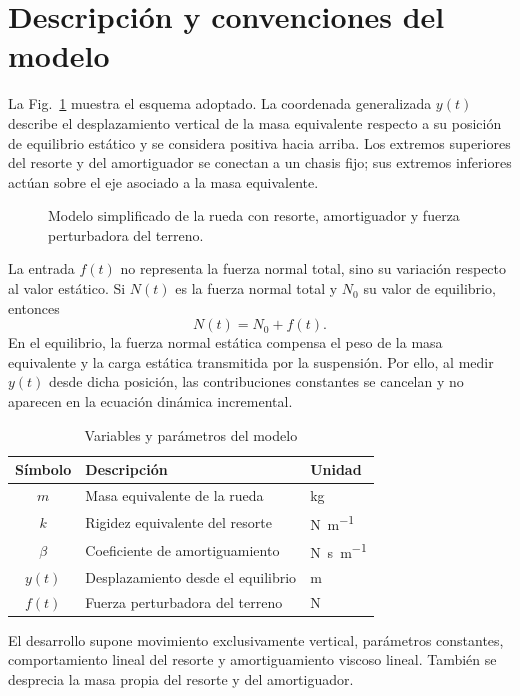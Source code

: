 \section{Descripción y convenciones del modelo}

La Fig.~\ref{fig:sistema} muestra el esquema adoptado. La coordenada generalizada $y(t)$ describe el desplazamiento vertical de la masa equivalente respecto a su posición de equilibrio estático y se considera positiva hacia arriba. Los extremos superiores del resorte y del amortiguador se conectan a un chasis fijo; sus extremos inferiores actúan sobre el eje asociado a la masa equivalente.

\begin{figure}[t]
  \centering
  
  \caption{Modelo simplificado de la rueda con resorte, amortiguador y fuerza perturbadora del terreno.}
  \label{fig:sistema}
\end{figure}

La entrada $f(t)$ no representa la fuerza normal total, sino su variación respecto al valor estático. Si $N(t)$ es la fuerza normal total y $N_0$ su valor de equilibrio, entonces
\begin{equation}
  N(t)=N_0+f(t).
\end{equation}
En el equilibrio, la fuerza normal estática compensa el peso de la masa equivalente y la carga estática transmitida por la suspensión. Por ello, al medir $y(t)$ desde dicha posición, las contribuciones constantes se cancelan y no aparecen en la ecuación dinámica incremental.

\begin{table}[t]
  \caption{Variables y parámetros del modelo}
  \label{tab:simbolos}
  \centering
  \begin{tabular}{@{}cll@{}}
    \toprule
    Símbolo & Descripción & Unidad \\
    \midrule
    $m$ & Masa equivalente de la rueda & \si{\kilogram} \\
    $k$ & Rigidez equivalente del resorte & \si{\newton\per\meter} \\
    $\beta$ & Coeficiente de amortiguamiento & \si{\newton\second\per\meter} \\
    $y(t)$ & Desplazamiento desde el equilibrio & \si{\meter} \\
    $f(t)$ & Fuerza perturbadora del terreno & \si{\newton} \\
    \bottomrule
  \end{tabular}
\end{table}

El desarrollo supone movimiento exclusivamente vertical, parámetros constantes, comportamiento lineal del resorte y amortiguamiento viscoso lineal. También se desprecia la masa propia del resorte y del amortiguador.

